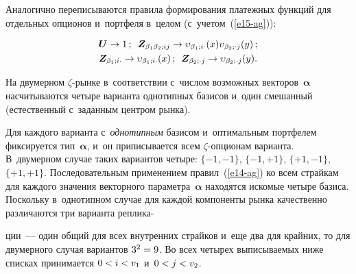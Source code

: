 \begin{multicols}{2}
  \vspace*{-3pt}
  
  Аналогично переписываются правила формирования платежных функций 
для отдельных опционов и~портфеля в~целом (с~учетом~(\ref{e15-ag})): 

\vspace*{-6pt}

\noindent
  \begin{multline}
  \boldsymbol{U}\to 1\,;\enskip 
\boldsymbol{Z}_{\beta_1\beta_2;ij}\to\upsilon_{\beta_1;i\cdot}(x)\upsilon_{\beta_2;\cdot 
j}(y)\,;\\
  \boldsymbol{Z}_{\beta_1;i\cdot}\to \upsilon_{\beta_1;i\cdot}(x)\,;\enskip
   \boldsymbol{Z}_{\beta_2;\cdot  j}\to \upsilon_{\beta_2;\cdot j}(y).
  \label{e17-ag}
  \end{multline}
  
  \vspace*{-3pt}
  
  На двумерном $\zeta$-рын\-ке в~соответствии с~чис\-лом возможных 
векторов~$\boldsymbol{\alpha}$ на\-счи\-ты\-ва\-ют\-ся четыре варианта однотипных 
базисов и~один смешанный (естественный с~заданным цент\-ром рынка). 
  
  Для каждого варианта с~\textit{однотипным} базисом и~оптимальным 
портфелем фиксируется тип~$\boldsymbol{\alpha}$, и~он приписывается всем 
$\zeta$-оп\-ци\-о\-нам варианта. В~двумерном случае таких вариантов четыре: 
$\{-1,-1\}$, $\{-1,+1\}$, $\{+1,-1\}$, $\{+1,+1\}$. Последовательным 
применением правил~(\ref{e14-ag}) ко всем страйкам для каж\-до\-го значения 
векторного параметра~$\boldsymbol{\alpha}$ находятся искомые четыре базиса. 
Поскольку в~однотипном случае для каж\-дой компоненты рын\-ка качественно 
различаются три варианта реплика-\linebreak\vspace*{-12pt}

\pagebreak

\noindent
ции~--- один общий для всех внут\-рен\-них 
страйков и~еще два для крайних, то для двумерного случая вариантов 
$3^2\hm = 9$. Во всех четырех выписываемых ниже спис\-ках принимается 
$0 \hm< i \hm< v_1$ и~$0 \hm< j \hm< v_2$. 
  

\end{multicols}
